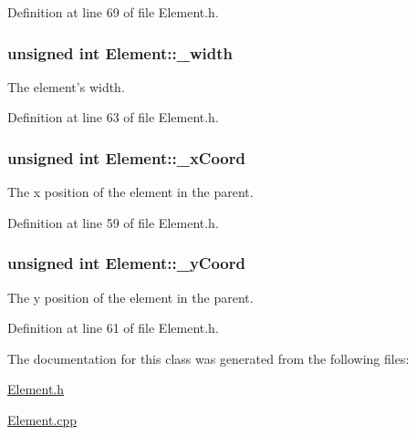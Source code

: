 Definition at line 69 of file Element.\-h.

\hypertarget{class_element_a559a2b7894e65668aee75346a3976f86}{
\subsubsection[{\-\_\-width}]{\setlength{\rightskip}{0pt plus 5cm}unsigned int Element\-::\-\_\-width\hspace{0.3cm}{\ttfamily [protected]}}}\label{class_element_a559a2b7894e65668aee75346a3976f86}
The element's width. 

Definition at line 63 of file Element.\-h.

\hypertarget{class_element_a53e4a4ffd5e4e60ce40f55f910d11f23}{
\subsubsection[{\-\_\-x\-Coord}]{\setlength{\rightskip}{0pt plus 5cm}unsigned int Element\-::\-\_\-x\-Coord\hspace{0.3cm}{\ttfamily [protected]}}}\label{class_element_a53e4a4ffd5e4e60ce40f55f910d11f23}
The x position of the element in the parent. 

Definition at line 59 of file Element.\-h.

\hypertarget{class_element_ab7215197a138c164d0ab07d7632e2ef2}{
\subsubsection[{\-\_\-y\-Coord}]{\setlength{\rightskip}{0pt plus 5cm}unsigned int Element\-::\-\_\-y\-Coord\hspace{0.3cm}{\ttfamily [protected]}}}\label{class_element_ab7215197a138c164d0ab07d7632e2ef2}
The y position of the element in the parent. 

Definition at line 61 of file Element.\-h.



The documentation for this class was generated from the following files\-:\begin{DoxyCompactItemize}
\item 
\hyperlink{_element_8h}{Element.\-h}\item 
\hyperlink{_element_8cpp}{Element.\-cpp}\end{DoxyCompactItemize}

